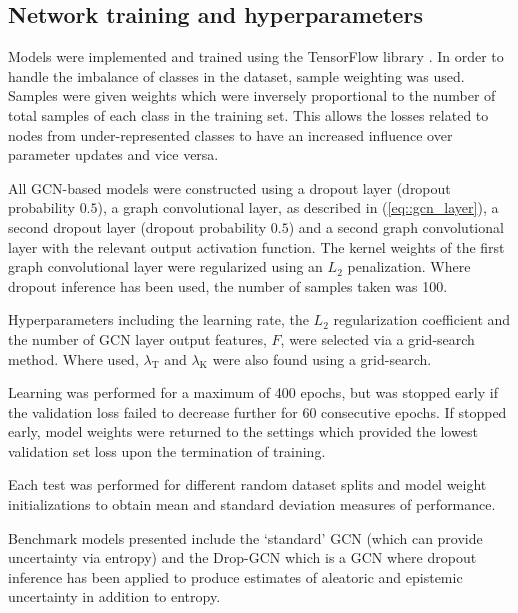 \documentclass[
twocolumn,
]{ceurart}
\begin{document}
\subsection{Network training and hyperparameters}
Models were implemented and trained using the TensorFlow library \cite{Abadi2015}.
In order to handle the imbalance of classes in the dataset, sample weighting was used.
Samples were given weights which were inversely proportional to the number of total samples of each class in the training set.
This allows the losses related to nodes from under-represented classes to have an increased influence over parameter updates and vice versa.

All GCN-based models were constructed using a dropout layer (dropout probability $0.5$), a graph convolutional layer, as described in (\ref{eq::gcn_layer}), a second dropout layer (dropout probability $0.5$) and a second graph convolutional layer with the relevant output activation function.
The kernel weights of the first graph convolutional layer were regularized using an $L_2$ penalization.
Where dropout inference has been used, the number of samples taken was 100.

Hyperparameters including the learning rate, the $L_2$ regularization coefficient and the number of GCN layer output features, $F$, were selected via a grid-search method.
Where used, $\lambda_{\text{T}}$ and $\lambda_{\text{K}}$ were also found using a grid-search.

Learning was performed for a maximum of 400 epochs, but was stopped early if the validation loss failed to decrease further for 60 consecutive epochs.
If stopped early, model weights were returned to the settings which provided the lowest validation set loss upon the termination of training.

Each test was performed for different random dataset splits and model weight initializations to obtain mean and standard deviation measures of performance.

Benchmark models presented include the `standard' GCN (which can provide uncertainty via entropy) and the Drop-GCN which is a GCN where dropout inference has been applied to produce estimates of aleatoric and epistemic uncertainty in addition to entropy.
\end{document}
